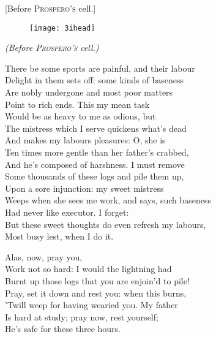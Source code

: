 
[Before \textsc{Prospero's} cell.]

\begin{figure}[t]
	\centering
	\texttt{[image: 3ihead]}
\end{figure}

\vspace{\textsink}

\textit{(Before \textsc{Prospero's} cell.)}\centering


\begin{verse_speech}[Ferdinand] 
There be some sports are painful, and their labour\\
Delight in them sets off: some kinds of baseness\\
Are nobly undergone and most poor matters\\
Point to rich ends. This my mean task\\
Would be as heavy to me as odious, but\\
The mistress which I serve quickens what's dead\\
And makes my labours pleasures: O, she is\\
Ten times more gentle than her father's crabbed,\\
And he's composed of harshness. I must remove\\
Some thousands of these logs and pile them up,\\
Upon a sore injunction: my sweet mistress\\
Weeps when she sees me work, and says, such baseness\\
Had never like executor. I forget:\\
But these sweet thoughts do even refresh my labours,\\
Most busy lest, when I do it.
\end{verse_speech}


\begin{verse_speech}[Miranda] 
Alas, now, pray you,\\
Work not so hard: I would the lightning had\\
Burnt up those logs that you are enjoin'd to pile!\\
Pray, set it down and rest you: when this burns,\\
'Twill weep for having wearied you. My father\\
Is hard at study; pray now, rest yourself;\\
He's safe for these three hours.
\end{verse_speech}

